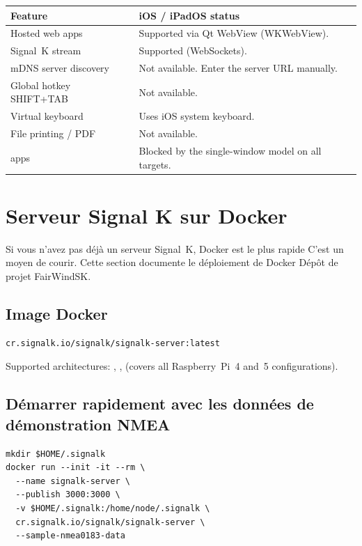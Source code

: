 \begin{longtable}{L{5.2cm}L{8.5cm}}
\toprule
{}
\color{white}\sffamily\bfseries Feature &
\color{white}\sffamily\bfseries iOS / iPadOS status \\
\midrule
Hosted web apps          & Supported via Qt WebView (WKWebView). \\
Signal~K stream          & Supported (WebSockets). \\
mDNS server discovery    & Not available. Enter the server URL manually. \\
Global hotkey SHIFT+TAB  & Not available. \\
Virtual keyboard         & Uses iOS system keyboard. \\
File printing / PDF      & Not available. \\
 apps      & Blocked by the single-window model on all targets. \\
\bottomrule
\end{longtable}

\section{Serveur Signal K sur Docker}
\label{app:signalk-docker}

Si vous n'avez pas déjà un serveur Signal~K, Docker est le plus rapide
C'est un moyen de courir.
Cette section documente le déploiement de Docker
Dépôt de projet FairWindSK.

\subsection{Image Docker}

\begin{lstlisting}
cr.signalk.io/signalk/signalk-server:latest
\end{lstlisting}

Supported architectures: , ,
 (covers all Raspberry~Pi~4 and~5 configurations).

\subsection{Démarrer rapidement avec les données de démonstration NMEA}

\begin{lstlisting}
mkdir $HOME/.signalk
docker run --init -it --rm \
  --name signalk-server \
  --publish 3000:3000 \
  -v $HOME/.signalk:/home/node/.signalk \
  cr.signalk.io/signalk/signalk-server \
  --sample-nmea0183-data
\end{lstlisting}

